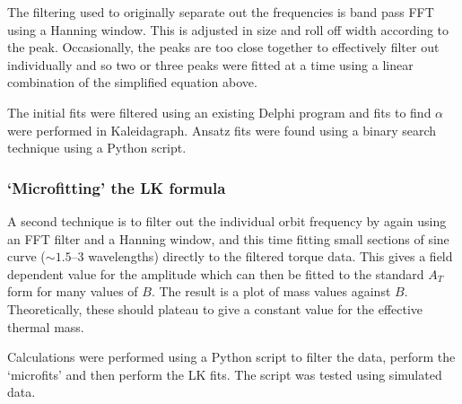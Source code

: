 The filtering used to originally separate out the frequencies is band pass \ac{FFT} using a Hanning window.  This is adjusted in size and roll off width according to the peak. Occasionally, the peaks are too close together to effectively filter out individually and so two or three peaks were fitted at a time using a linear combination of the simplified equation above.

The initial fits were filtered using an existing Delphi program and fits to find $\alpha$ were performed in Kaleidagraph. Ansatz fits were found using a binary search technique using a Python script.


\subsubsection{`Microfitting' the \ac{LK} formula}
\label{Sec:Exp:LKMicrofitting}

A second technique is to filter out the individual orbit frequency by again using an \ac{FFT} filter and a Hanning window, and this time fitting small sections of sine curve ($\sim 1.5$--$3$ wavelengths) directly to the filtered torque data. This gives a field dependent value for the amplitude which can then be fitted to the standard $A_T$ form for many values of $B$. The result is a plot of mass values against $B$. Theoretically, these should plateau to give a constant value for the effective thermal mass.

Calculations were performed using a Python script to filter the data, perform the `microfits' and then perform the \ac{LK} fits. The script was tested using simulated data.


